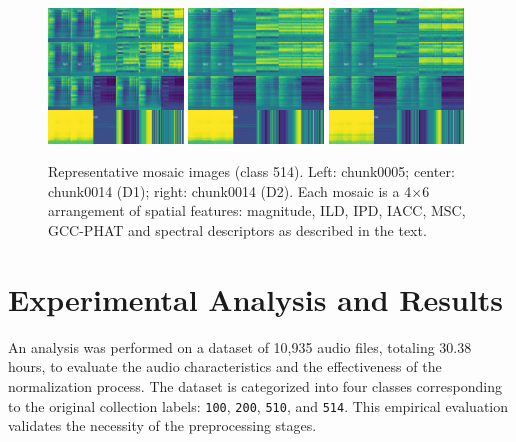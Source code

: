 \documentclass[12pt, a4paper]{article}
\begin{document}
\begin{figure}[h!]
    \centering
    \includegraphics[width=0.32\textwidth]{img/binaural_audio_D1_48K_24bit_0.3s_FIR_SOFA_ac06-globo-1_0_chunk0005.png}
    \includegraphics[width=0.32\textwidth]{img/binaural_audio_D1_48K_24bit_0.3s_FIR_SOFA_ac06-globo-1_0_chunk0014.png}
    \includegraphics[width=0.32\textwidth]{img/binaural_audio_D2_48K_24bit_0.3s_FIR_SOFA_ac06-globo-1_0_chunk0014.png}
    \caption{Representative mosaic images (class 514). Left: chunk0005; center: chunk0014 (D1); right: chunk0014 (D2). Each mosaic is a 4$\times$6 arrangement of spatial features: magnitude, ILD, IPD, IACC, MSC, GCC-PHAT and spectral descriptors as described in the text.}
    \label{fig:example_mosaics}
\end{figure}


\section{Experimental Analysis and Results}
An analysis was performed on a dataset of 10,935 audio files, totaling 30.38 hours, to evaluate the audio characteristics and the effectiveness of the normalization process. The dataset is categorized into four classes corresponding to the original collection labels: \texttt{100}, \texttt{200}, \texttt{510}, and \texttt{514}. This empirical evaluation validates the necessity of the preprocessing stages.
\end{document}
